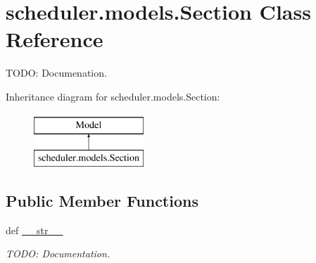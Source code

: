 \hypertarget{classscheduler_1_1models_1_1_section}{\section{scheduler.\-models.\-Section Class Reference}
\label{classscheduler_1_1models_1_1_section}
}


T\-O\-D\-O\-: Documenation.  


Inheritance diagram for scheduler.\-models.\-Section\-:\begin{figure}[H]
\begin{center}
\leavevmode
\includegraphics[height=2.000000cm]{classscheduler_1_1models_1_1_section}
\end{center}
\end{figure}
\subsection*{Public Member Functions}
\begin{DoxyCompactItemize}
\item 
\hypertarget{classscheduler_1_1models_1_1_section_a246a1f55dd3ce2f8b7e22b381535e09d}{def \hyperlink{classscheduler_1_1models_1_1_section_a246a1f55dd3ce2f8b7e22b381535e09d}{\-\_\-\-\_\-str\-\_\-\-\_\-}}\label{classscheduler_1_1models_1_1_section_a246a1f55dd3ce2f8b7e22b381535e09d}

\begin{DoxyCompactList}\small\item\em T\-O\-D\-O\-: Documentation. \end{DoxyCompactList}\end{DoxyCompactItemize}
